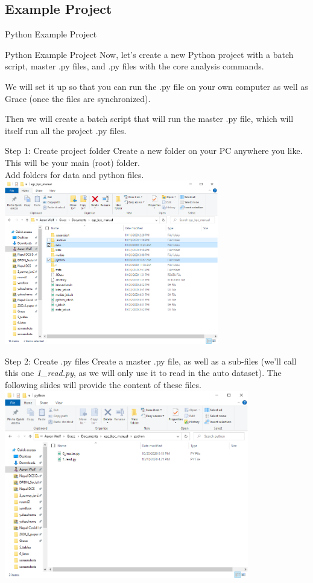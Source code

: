 \documentclass[10pt,xcolor={svgnames}]{beamer}
\begin{document}
\subsection{Example Project}
\begin{frame}[standout]
  Python Example Project
\end{frame}

\begin{frame}{Python Example Project}
Now, let's create a new Python project with a batch script, master .py files, and .py files with the core analysis commands.

We will set it up so that you can run the .py file on your own computer as well as Grace (once the files are synchronized).

Then we will create a batch script that will run the master .py file, which will itself run all the project .py files.
\end{frame}

\begin{frame}{Step 1: Create project folder}
\center
Create a new folder on your PC anywhere you like. This will be your main (root) folder. \\ Add folders for data and python files.
\includegraphics[width=0.7\textwidth]{screenshots/fig13a.PNG} 
\end{frame}

\begin{frame}{Step 2: Create .py files}
\center
Create a master .py file, as well as a sub-files (we'll call this one \textit{1\_read.py}, as we will only use it to read in the auto dataset). The following slides will provide the content of these files.
\includegraphics[width=0.8\textwidth]{screenshots/fig13b.PNG} 
\end{frame}
\end{document}
